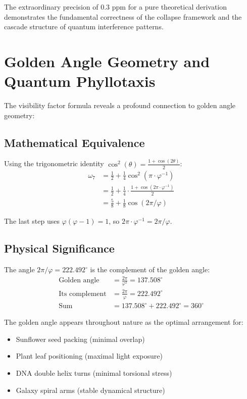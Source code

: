 \documentclass[%
 reprint,
 amsmath,amssymb,
 aps,
 prd,
 10pt,
 nofootinbib,      %
 longbibliography  %
]{revtex4-2}
\theoremstyle{definition}
\theoremstyle{remark}
\begin{document}
The extraordinary precision of 0.3 ppm for a pure theoretical derivation demonstrates the fundamental correctness of the collapse framework and the cascade structure of quantum interference patterns.

\section{Golden Angle Geometry and Quantum Phyllotaxis}\label{sec:golden}

The visibility factor formula reveals a profound connection to golden angle geometry:

\subsection{Mathematical Equivalence}

Using the trigonometric identity $\cos^2(\theta) = \frac{1 + \cos(2\theta)}{2}$:
\begin{align}
\omega_7 &= \frac{1}{2} + \frac{1}{4}\cos^2(\pi \cdot \varphi^{-1}) \\
&= \frac{1}{2} + \frac{1}{4} \cdot \frac{1 + \cos(2\pi \cdot \varphi^{-1})}{2} \\
&= \frac{5}{8} + \frac{1}{8}\cos(2\pi/\varphi)
\end{align}

The last step uses $\varphi(\varphi - 1) = 1$, so $2\pi \cdot \varphi^{-1} = 2\pi/\varphi$.

\subsection{Physical Significance}

The angle $2\pi/\varphi = 222.492^\circ$ is the complement of the golden angle:
\begin{align}
\text{Golden angle} &= \frac{2\pi}{\varphi^2} = 137.508^\circ \\
\text{Its complement} &= \frac{2\pi}{\varphi} = 222.492^\circ \\
\text{Sum} &= 137.508^\circ + 222.492^\circ = 360^\circ
\end{align}

The golden angle appears throughout nature as the optimal arrangement for:
\begin{itemize}
\item Sunflower seed packing (minimal overlap)
\item Plant leaf positioning (maximal light exposure)
\item DNA double helix turns (minimal torsional stress)
\item Galaxy spiral arms (stable dynamical structure)
\end{itemize}
\end{document}
